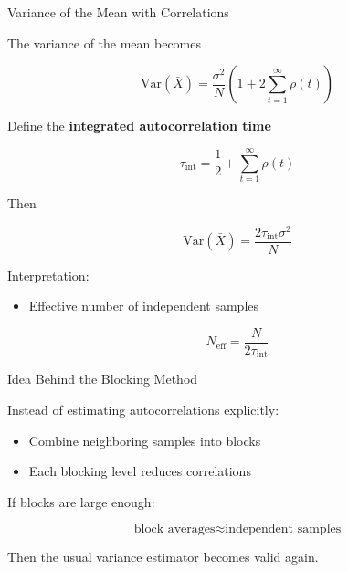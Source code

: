\documentclass{beamer}
\begin{document}

\begin{frame}{Variance of the Mean with Correlations}

  The variance of the mean becomes

  \[
  \mathrm{Var}(\bar X)
  =
  \frac{\sigma^2}{N}
  \left(
  1
  +
  2\sum_{t=1}^{\infty}\rho(t)
  \right)
  \]

  Define the \textbf{integrated autocorrelation time}

  \[
  \tau_{\mathrm{int}}
  =
  \frac{1}{2}
  +
  \sum_{t=1}^{\infty}\rho(t)
  \]

  Then

  \[
  \mathrm{Var}(\bar X)
  =
  \frac{2\tau_{\mathrm{int}}\sigma^2}{N}
  \]

  Interpretation:

  \begin{itemize}
  \item Effective number of independent samples
  \end{itemize}

  \[
  N_{\mathrm{eff}}
  =
  \frac{N}{2\tau_{\mathrm{int}}}
  \]
\end{frame}


\begin{frame}{Idea Behind the Blocking Method}

  Instead of estimating autocorrelations explicitly:

  \begin{itemize}
  \item Combine neighboring samples into blocks
  \item Each blocking level reduces correlations
  \end{itemize}

  If blocks are large enough:

  \[
  \text{block averages} \approx \text{independent samples}
  \]

  Then the usual variance estimator becomes valid again.
\end{frame}

\end{document}
